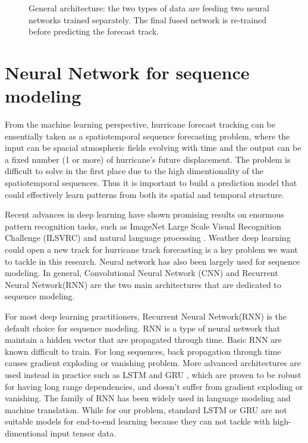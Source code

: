 \begin{figure}[H]
	\begin{center}
		\hsize {}
	\end{center}
	\caption{General architecture: the two types of data are feeding two neural networks trained separately. The final fused network is re-trained before predicting the forecast track. }
	\label{fig::task}
\end{figure}

\section{Neural Network for sequence modeling}
From the machine learning perspective, hurricane forecast tracking can be ensentially taken as a spatiotemporal sequence forecasting problem, where the input can be spacial atmospheric fields evolving with time and the output can be a fixed number (1 or more) of hurricane's future displacement. The problem is difficult to solve in the first place due to the high dimentionality of the spatiotemporal sequences. Thus it is important to build a prediction model that could effectively learn patterns from both its spatial and temporal structure. 

Recent advances in deep learning have shown promising results on enormous pattern recognition tasks, such as ImageNet Large Scale Visual Recognition Challenge (ILSVRC) \cite{russakovsky2015imagenet} \cite{krizhevsky2012imagenet}  \cite{szegedy2015going} and natural language processing \cite{goldberg2014word2vec} \cite{sutskever2014sequence}. Weather deep learning could open a new track for hurricane track forecasting is a key problem we want to tackle in this research. Neural network has also been largely used for sequence modeling. In general, Convolutional Neural Network (CNN) and Recurrent Neural Network(RNN) are the two main architectures that are dedicated to sequence modeling. 

For most deep learning practitioners, Recurrent Neural Network(RNN) is the default choice for sequence modeling. RNN is a type of neural network that maintain a hidden vector that are propagated through time. Basic RNN are known difficult to train. For long sequences, back propagation through time causes gradient exploding or vanishing problem. More advanced architectures are used instead in practice such as LSTM\cite{hochreiter1997long} and GRU \cite{collobert2008unified}, which are proven to be robust for having long range dependencies, and doesn't suffer from gradient exploding or vanishing. The family of RNN has been widely used in language modeling\cite{graves2013generating} and machine translation\cite{sutskever2014sequence}.  While for our problem, standard LSTM or GRU are not suitable models for end-to-end learning because they can not tackle with high-dimentional input tensor data. 

